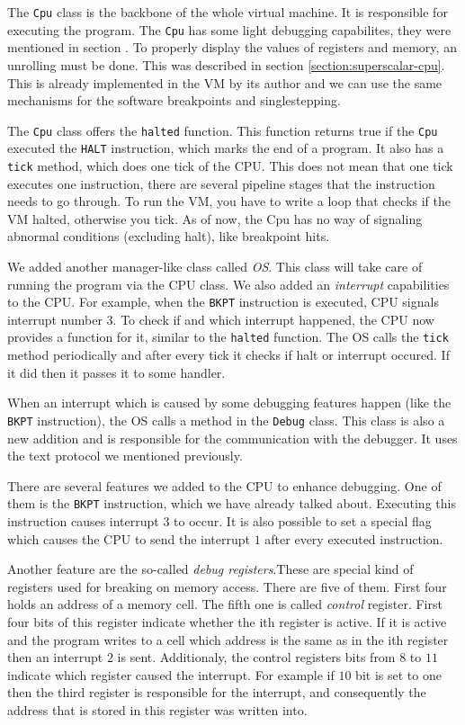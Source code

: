 The \texttt{Cpu} class is the backbone of the whole virtual machine. It is
responsible for executing the program. The \texttt{Cpu} has some light debugging
capabilites, they were mentioned in section . To properly display the
values of registers and memory, an unrolling must be done. This was described
in section \ref{section:superscalar-cpu}. This is already implemented in the VM
by its author and we can use the same mechanisms for the software breakpoints
and singlestepping.

The \texttt{Cpu} class offers the \texttt{halted} function. This function
returns true if the \texttt{Cpu} executed the \texttt{HALT} instruction, which
marks the end of a program. It also has a \texttt{tick} method, which does one
tick of the CPU. This does not mean that one tick executes one instruction,
there are several pipeline stages that the instruction needs to go through. To
run the VM, you have to write a loop that checks if the VM halted, otherwise
you tick. As of now, the Cpu has no way of signaling abnormal conditions
(excluding halt), like breakpoint hits.

We added another manager-like class called \textit{OS}. This class will take
care of running the program via the CPU class. We also added an \textit{interrupt}
capabilities to the CPU. For example, when the \texttt{BKPT} instruction is
executed, CPU signals interrupt number $3$. To check if and which interrupt
happened, the CPU now provides a function for it, similar to the
\texttt{halted} function. The OS calls the \texttt{tick} method periodically
and after every tick it checks if halt or interrupt occured. If it did then it
passes it to some handler.

When an interrupt which is caused by some debugging features happen (like the
\texttt{BKPT} instruction), the OS calls a method in the \texttt{Debug} class.
This class is also a new addition and is responsible for the communication with
the debugger. It uses the text protocol we mentioned previously.

There are several features we added to the CPU to enhance debugging. One of them
is the \texttt{BKPT} instruction, which we have already talked about. Executing
this instruction causes interrupt $3$ to occur. It is also possible to set a
special flag which causes the CPU to send the interrupt $1$ after every executed
instruction. 

Another feature are the so-called \textit{debug registers}.These are special
kind of registers used for breaking on memory access. There are five of them.
First four holds an address of a memory cell. The fifth one is called
\textit{control} register. First four bits of this register indicate whether
the ith register is active. If it is active and the program writes to a cell
which address is the same as in the ith register then an interrupt $2$ is sent.
Additionaly, the control registers bits from $8$ to $11$ indicate which
register caused the interrupt. For example if $10$ bit is set to one then the
third register is responsible for the interrupt, and consequently the address
that is stored in this register was written into.

